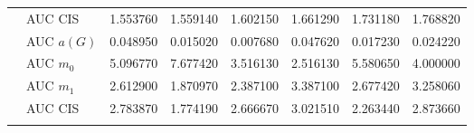 \begin{table}[htbp]
\begin{tabular}{llrrrrrr}
    & AUC CIS & 1.553760 & 1.559140 & 1.602150 & 1.661290 & 1.731180 & 1.768820 \\
    \addlinespace
    \multirow{4}{*}{random} & AUC $a(G)$ & 0.048950 & 0.015020 & 0.007680 & 0.047620 & 0.017230 & 0.024220 \\
    & AUC $m_0$ & 5.096770 & 7.677420 & 3.516130 & 2.516130 & 5.580650 & 4.000000 \\
    & AUC $m_1$ & 2.612900 & 1.870970 & 2.387100 & 3.387100 & 2.677420 & 3.258060 \\
    & AUC CIS & 2.783870 & 1.774190 & 2.666670 & 3.021510 & 2.263440 & 2.873660 \\
    \addlinespace
    \bottomrule
  \end{tabular}
\end{table}

